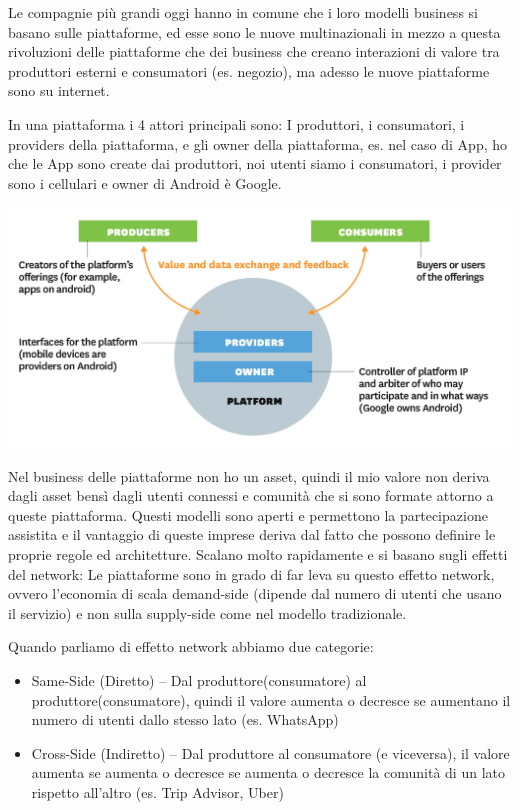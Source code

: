 \documentclass[a4page, 11pt]{article}
\begin{document}
Le compagnie più grandi oggi hanno in comune che i loro modelli business
si basano sulle piattaforme, ed esse sono le nuove multinazionali in
mezzo a questa rivoluzioni delle piattaforme che dei business che creano
interazioni di valore tra produttori esterni e consumatori (es.
negozio), ma adesso le nuove piattaforme sono su internet.

In una piattaforma i 4 attori principali sono: I produttori, i
consumatori, i providers della piattaforma, e gli owner della
piattaforma, es. nel caso di App, ho che le App sono create dai
produttori, noi utenti siamo i consumatori, i provider sono i cellulari
e owner di Android è Google.
\begin{center}
	\includegraphics[scale=0.4]{image4.png}
\end{center}

Nel business delle piattaforme non ho un asset, quindi il mio valore non
deriva dagli asset bensì dagli utenti connessi e comunità che si sono
formate attorno a queste piattaforma. Questi modelli sono aperti e
permettono la partecipazione assistita e il vantaggio di queste imprese
deriva dal fatto che possono definire le proprie regole ed architetture.
Scalano molto rapidamente e si basano sugli effetti del network: Le
piattaforme sono in grado di far leva su questo effetto network, ovvero
l'economia di scala demand-side (dipende dal numero di utenti che usano
il servizio) e non sulla supply-side come nel modello tradizionale.

Quando parliamo di effetto network abbiamo due categorie:

\begin{itemize}
	 
	\item
	Same-Side (Diretto) -- Dal produttore(consumatore) al
	produttore(consumatore), quindi il valore aumenta o decresce se
	aumentano il numero di utenti dallo stesso lato (es. WhatsApp)
	\item
	Cross-Side (Indiretto) -- Dal produttore al consumatore (e viceversa),
	il valore aumenta se aumenta o decresce se aumenta o decresce la
	comunità di un lato rispetto all'altro (es. Trip Advisor, Uber)
\end{itemize}
\end{document}
